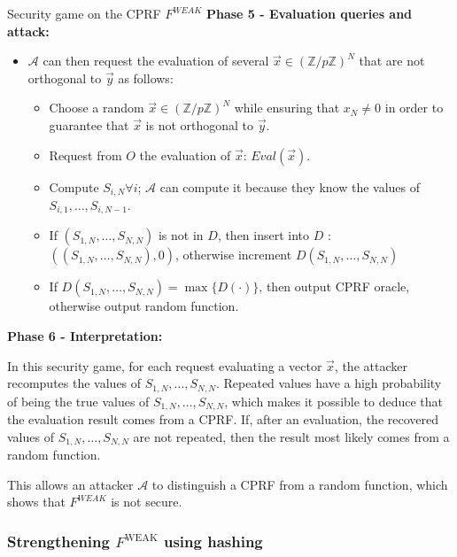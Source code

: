 \documentclass[9pt]{extarticle}
\begin{document}
\begin{defbox}{Security game on the CPRF $F^{WEAK}$}
  \medskip
  \textbf{Phase 5 - Evaluation queries and attack:}
  \begin{itemize}
  \item $\mathcal{A}$ can then request the evaluation of several $\vec{x} \in (\mathbb{Z}/p\mathbb{Z})^N$ that are not orthogonal to $\vec{y}$ as follows:
    \begin{itemize}
      \item Choose a random $\vec{x} \in (\mathbb{Z}/p\mathbb{Z})^N$ while ensuring that $x_N \neq 0$ in order to guarantee that $\vec{x}$ is not orthogonal to $\vec{y}$.
      \item Request from $O$ the evaluation of $\vec{x}$: $Eval(\vec{x})$.
      \item Compute $S_{i,N} \forall i$; $\mathcal{A}$ can compute it because they know the values of $S_{i,1},\ldots,S_{i,N-1}$.
      \item If $(S_{1,N},\ldots,S_{N,N})$ is not in $D$, then insert into $D$ : $( (S_{1,N},\ldots,S_{N,N}), 0)$, otherwise increment $D(S_{1,N},\ldots,S_{N,N})$
      \item If $D(S_{1,N},\ldots,S_{N,N}) = \max\{D(\cdot)\}$, then output CPRF oracle, otherwise output random function.
    \end{itemize}
  \end{itemize}

  \medskip

  \textbf{Phase 6 - Interpretation:}

  In this security game, for each request evaluating a vector $\vec{x}$, the attacker recomputes the values of $S_{1,N},\ldots,S_{N,N}$. Repeated values have a high probability of being the true values of $S_{1,N},\ldots,S_{N,N}$, which makes it possible to deduce that the evaluation result comes from a CPRF. If, after an evaluation, the recovered values of $S_{1,N},\ldots,S_{N,N}$ are not repeated, then the result most likely comes from a random function.

  \medskip

  This allows an attacker $\mathcal{A}$ to distinguish a CPRF from a random function, which shows that $F^{WEAK}$ is not secure.

\end{defbox}



\subsubsection{Strengthening \texorpdfstring{$F^{\text{WEAK}}$}{F WEAK} using hashing}
\end{document}
